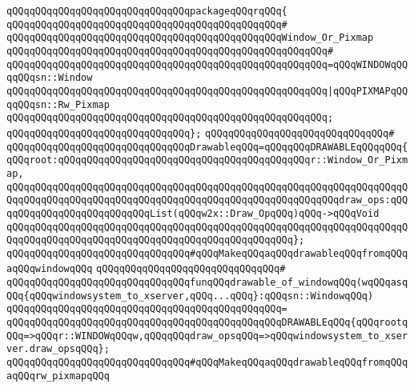 \verb|qQQqqQQqqQQqqQQqqQQqqQQqqQQqqQQqpackageqQQqrqQQq{|\newline
\verb|qQQqqQQqqQQqqQQqqQQqqQQqqQQqqQQqqQQqqQQqqQQqqQQq#|\newline
\verb|qQQqqQQqqQQqqQQqqQQqqQQqqQQqqQQqqQQqqQQqqQQqqQQqWindow_Or_Pixmap|\newline
\verb|qQQqqQQqqQQqqQQqqQQqqQQqqQQqqQQqqQQqqQQqqQQqqQQqqQQqqQQq#|\newline
\verb|qQQqqQQqqQQqqQQqqQQqqQQqqQQqqQQqqQQqqQQqqQQqqQQqqQQqqQQq=qQQqWINDOWqQQqqQQqsn::Window|\newline
\verb|qQQqqQQqqQQqqQQqqQQqqQQqqQQqqQQqqQQqqQQqqQQqqQQqqQQqqQQq|\verb#|qQQqPIXMAPqQQqqQQqsn::Rw_Pixmap#\newline
\verb|qQQqqQQqqQQqqQQqqQQqqQQqqQQqqQQqqQQqqQQqqQQqqQQqqQQqqQQq;|\newline
\verb|qQQqqQQqqQQqqQQqqQQqqQQqqQQqqQQq};|\newline
\verb|qQQqqQQqqQQqqQQqqQQqqQQqqQQqqQQq#|\newline
\verb|qQQqqQQqqQQqqQQqqQQqqQQqqQQqqQQqDrawableqQQq=qQQqqQQqDRAWABLEqQQqqQQq{qQQqroot:qQQqqQQqqQQqqQQqqQQqqQQqqQQqqQQqqQQqqQQqqQQqr::Window_Or_Pixmap,|\newline
\verb|qQQqqQQqqQQqqQQqqQQqqQQqqQQqqQQqqQQqqQQqqQQqqQQqqQQqqQQqqQQqqQQqqQQqqQQqqQQqqQQqqQQqqQQqqQQqqQQqqQQqqQQqqQQqqQQqqQQqqQQqqQQqqQQqdraw_ops:qQQqqQQqqQQqqQQqqQQqqQQqqQQqList(qQQqw2x::Draw_OpqQQq)qQQq->qQQqVoid|\newline
\verb|qQQqqQQqqQQqqQQqqQQqqQQqqQQqqQQqqQQqqQQqqQQqqQQqqQQqqQQqqQQqqQQqqQQqqQQqqQQqqQQqqQQqqQQqqQQqqQQqqQQqqQQqqQQqqQQqqQQqqQQq};|\newline
\newline
\verb|qQQqqQQqqQQqqQQqqQQqqQQqqQQqqQQq#qQQqMakeqQQqaqQQqdrawableqQQqfromqQQqaqQQqwindowqQQq|\newline
\verb|qQQqqQQqqQQqqQQqqQQqqQQqqQQqqQQq#|\newline
\verb|qQQqqQQqqQQqqQQqqQQqqQQqqQQqqQQqfunqQQqdrawable_of_windowqQQq(wqQQqasqQQq{qQQqwindowsystem_to_xserver,qQQq...qQQq}:qQQqsn::WindowqQQq)|\newline
\verb|qQQqqQQqqQQqqQQqqQQqqQQqqQQqqQQqqQQqqQQqqQQqqQQq=|\newline
\verb|qQQqqQQqqQQqqQQqqQQqqQQqqQQqqQQqqQQqqQQqqQQqqQQqDRAWABLEqQQq{qQQqrootqQQq=>qQQqr::WINDOWqQQqw,qQQqqQQqdraw_opsqQQq=>qQQqwindowsystem_to_xserver.draw_opsqQQq};|\newline
\newline
\newline
\verb|qQQqqQQqqQQqqQQqqQQqqQQqqQQqqQQq#qQQqMakeqQQqaqQQqdrawableqQQqfromqQQqaqQQqrw_pixmapqQQq|\newline
